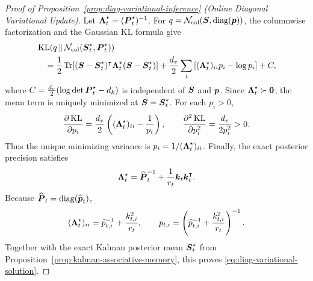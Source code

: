 \documentclass{article} %
\begin{document}
\begin{proof}[Proof of Proposition~\ref{prop:diag-variational-inference}
  (Online Diagonal Variational Update)]
Let $\boldsymbol{\Lambda}_t^\star=(\boldsymbol{P}_t^\star)^{-1}$. For
$q=\mathcal N_{\mathrm{col}}(\boldsymbol{S},\operatorname{diag}(\boldsymbol{p}))$, the columnwise factorization and the Gaussian KL formula give
\begin{equation}
\begin{aligned}
  &\operatorname{KL}\!\left(
    q\,\|\,\mathcal N_{\mathrm{col}}(\boldsymbol{S}_t^\star,\boldsymbol{P}_t^\star)
  \right) \\
  &\quad
    =\frac12\operatorname{Tr}\!\left[
      (\boldsymbol{S}-\boldsymbol{S}_t^\star)^{\intercal}
      \boldsymbol{\Lambda}_t^\star
      (\boldsymbol{S}-\boldsymbol{S}_t^\star)
    \right]
    +\frac{d_v}{2}\sum_i\left[
      (\boldsymbol{\Lambda}_t^\star)_{ii}p_i
      -\log p_i
    \right]+C,
  \label{eq:proof-diag-vi-objective}
\end{aligned}
\end{equation}
where $C=\frac{d_v}{2}(\log\det\boldsymbol{P}_t^\star-d_k)$ is independent of $\boldsymbol{S}$ and $\boldsymbol{p}$.
Since $\boldsymbol{\Lambda}_t^\star\succ\boldsymbol{0}$, the mean term is uniquely minimized at
$\boldsymbol{S}=\boldsymbol{S}_t^\star$. For each $p_i>0$,
\begin{equation}
  \frac{\partial\operatorname{KL}}{\partial p_i}
  =\frac{d_v}{2}\left(
    (\boldsymbol{\Lambda}_t^\star)_{ii}-\frac{1}{p_i}
  \right),
  \qquad
  \frac{\partial^2\operatorname{KL}}{\partial p_i^2}
  =\frac{d_v}{2p_i^2}>0.
  \label{eq:proof-diag-vi-derivatives}
\end{equation}
Thus the unique minimizing variance is
$p_i=1/(\boldsymbol{\Lambda}_t^\star)_{ii}$. Finally, the exact posterior precision satisfies
\begin{equation}
  \boldsymbol{\Lambda}_t^\star
  =\widehat{\boldsymbol{P}}_t^{-1}
   +\frac{1}{r_t}\boldsymbol{k}_t\boldsymbol{k}_t^{\intercal}.
  \label{eq:proof-diag-vi-exact-precision}
\end{equation}
Because $\widehat{\boldsymbol{P}}_t=\operatorname{diag}(\widehat{\boldsymbol{p}}_t)$,
\begin{equation}
  (\boldsymbol{\Lambda}_t^\star)_{ii}
  =\widehat p_{t,i}^{-1}+\frac{k_{t,i}^2}{r_t},
  \qquad
  p_{t,i}
  =\left(\widehat p_{t,i}^{-1}+\frac{k_{t,i}^2}{r_t}\right)^{-1}.
  \label{eq:proof-diag-vi-variance}
\end{equation}
Together with the exact Kalman posterior mean $\boldsymbol{S}_t^\star$ from
Proposition~\ref{prop:kalman-associative-memory}, this proves
\eqref{eq:diag-variational-solution}.
\end{proof}

\end{document}
